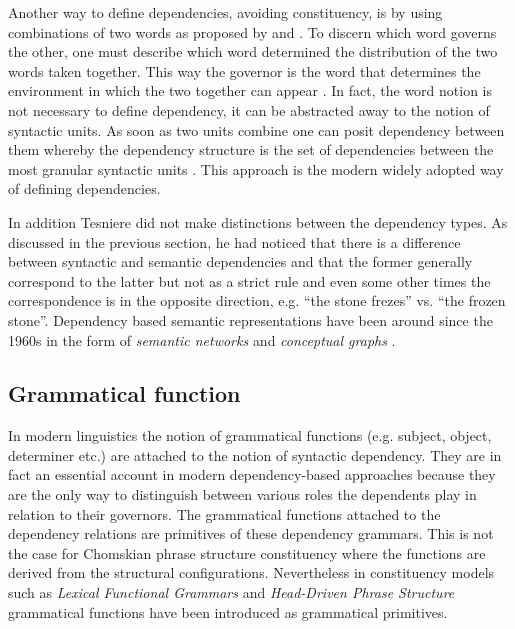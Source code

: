     Another way to define dependencies, avoiding constituency, is by using combinations of two words as proposed by \citet{Garde1977} and \citet{melcuk88}. To discern which word governs the other, one must describe which word determined the distribution of the two words taken together. This way the governor is the word that determines the environment in which the two together can appear \citep[lxi]{Tesniere2015}. In fact, the word notion is not necessary to define dependency, it can be abstracted away to the notion of syntactic units. As soon as two units combine one can posit dependency between them whereby the dependency structure is the set of dependencies between the most granular syntactic units \citep{gerdes2013defining}. This approach is the modern widely adopted way of defining dependencies.

    In addition Tesniere did not make distinctions between the dependency types. As discussed in the previous section, he had noticed that there is a difference between syntactic and semantic dependencies and that the former generally correspond to the latter but not as a strict rule and even some other times the correspondence is in the opposite direction, e.g. ``the stone frezes'' vs. ``the frozen stone''. Dependency based semantic representations have been around since the 1960s in the form of \textit{semantic networks} \citep{ZolkovskijMelcuk67,melcuk88} and \textit{conceptual graphs} \citep{schank1969, Sowa1976}.

\subsection{Grammatical function} 
    In modern linguistics the notion of grammatical functions (e.g. subject, object, determiner etc.) are attached to the notion of syntactic dependency. They are in fact an essential account in modern dependency-based approaches because they are the only way to distinguish between various roles the dependents play in relation to their governors. The grammatical functions attached to the dependency relations are primitives of these dependency grammars. This is not the case for Chomskian phrase structure constituency where the functions are derived from the structural configurations. Nevertheless in constituency models such as \textit{Lexical Functional Grammars} \citep{bresnan2015lexical} and \textit{Head-Driven Phrase Structure} \citep{PollardSag1994} grammatical functions have been introduced as grammatical primitives.

